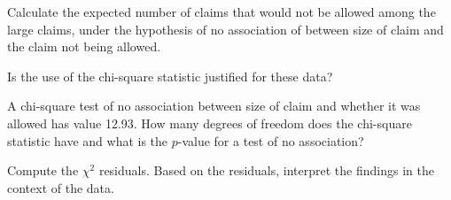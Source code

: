 {\begin{parts}
		\item Calculate the expected number of claims that would not be allowed among the large claims, under the hypothesis of no association of between size of claim and the claim not being allowed.  
		
		\item Is the use of the chi-square statistic justified for these data?
		
		\item A chi-square test of no association between size of claim and whether it was allowed has value 12.93. How many degrees of freedom does the chi-square statistic have and what is the $p$-value for a test of no association?
		
		\item Compute the $\chi^2$ residuals. Based on the residuals, interpret the findings in the context of the data.
		
	\end{parts}

}{}



